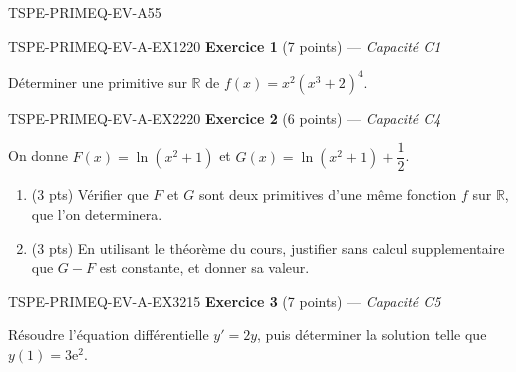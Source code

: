 

\begin{evaluation}{TSPE-PRIMEQ-EV-A}{55}

\begin{exercice}{TSPE-PRIMEQ-EV-A-EX1}{2}{20}
\textbf{Exercice 1} (7 points) — \textit{Capacité C1}

\medskip

Déterminer une primitive sur $\mathbb{R}$ de $f(x) = x^2(x^3+2)^4$.
\end{exercice}

\begin{exercice}{TSPE-PRIMEQ-EV-A-EX2}{2}{20}
\textbf{Exercice 2} (6 points) — \textit{Capacité C4}

\medskip

On donne $F(x) = \ln(x^2+1)$ et $G(x) = \ln(x^2+1) + \dfrac{1}{2}$.
\begin{enumerate}
  \item (3 pts) Vérifier que $F$ et $G$ sont deux primitives d'une même fonction $f$ sur $\mathbb{R}$, que l'on determinera.
  \item (3 pts) En utilisant le théorème du cours, justifier sans calcul supplementaire que $G-F$ est constante, et donner sa valeur.
\end{enumerate}
\end{exercice}

\begin{exercice}{TSPE-PRIMEQ-EV-A-EX3}{2}{15}
\textbf{Exercice 3} (7 points) — \textit{Capacité C5}

\medskip

Résoudre l'équation différentielle $y' = 2y$, puis déterminer la solution telle que $y(1) = 3\mathrm{e}^2$.
\end{exercice}

\end{evaluation}
